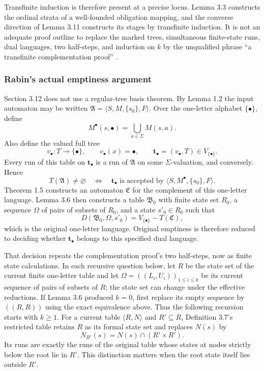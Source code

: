 Transfinite induction is therefore present at a precise locus.  Lemma 3.3
constructs the ordinal strata of a well-founded obligation mapping, and the
converse direction of Lemma 3.11 constructs its stages by transfinite
induction.  It is not an adequate proof outline to replace the marked trees,
simultaneous finite-state runs, dual languages, two half-steps, and induction
on \(k\) by the unqualified phrase
\enquote{a transfinite complementation proof}
\cite[pp.~19--32]{Rabin1969}.

\subsubsection{Rabin's actual emptiness argument}

Section 3.12 does not use a regular-tree basis theorem.  By Lemma 1.2 the
input automaton may be written
\(\mathfrak A=\langle S,M,\{s_0\},F\rangle\).  Over the one-letter alphabet
\(\{\bullet\}\), define
\[
 M^\bullet(s,\bullet)
   =\bigcup_{a\in\Sigma}M(s,a).
\]
Also define the valued full tree
\[
 v_\bullet:T\longrightarrow\{\bullet\},
 \qquad v_\bullet(x)=\bullet,
 \qquad \mathbf t_\bullet=(v_\bullet,T)\in V_{\{\bullet\}}.
\]
Every run of this table on \(\mathbf t_\bullet\) is a
run of \(\mathfrak A\) on some \(\Sigma\)-valuation, and conversely.  Hence
\[
 T(\mathfrak A)\neq\varnothing
 \quad\Longleftrightarrow\quad
 \mathbf t_\bullet\text{ is accepted by }
 \langle S,M^\bullet,\{s_0\},F\rangle.
\]
Theorem 1.5 constructs an automaton \(\mathfrak C\) for the complement of this
one-letter language.  Lemma 3.6 then constructs a table
\(\mathfrak B_0\) with finite state set \(R_0\), a sequence \(\Omega\) of pairs
of subsets of \(R_0\), and a state \(s'_0\in R_0\) such that
\[
 D(\mathfrak B_0,\Omega,s'_0)
   =V_{\{\bullet\}}-T(\mathfrak C),
\]
which is the original one-letter language.  Original emptiness is therefore
reduced to deciding whether \(\mathbf t_\bullet\) belongs to this specified dual
language.

That decision repeats the complementation proof's two half-steps, now as finite
state calculations.  In each recursive question below, let \(R\) be the state
set of the current finite one-letter table and let
\(\Omega=((L_i,U_i))_{1\leq i\leq k}\) be its current sequence of pairs of
subsets of \(R\); the state set can change under the effective reductions.  If
Lemma 3.6 produced \(k=0\), first replace its empty sequence by
\(((R,R))\) using the exact equivalence above.  Thus the following recursion
starts with \(k\geq1\).
For a current table \(\langle R,N\rangle\) and \(R'\subseteq R\), Definition
3.7's restricted table retains \(R\) as its formal state set and replaces
\(N(s)\) by
\[
 N_{R'}(s)=N(s)\cap(R'\times R').
\]
Its runs are exactly the runs of the original table whose states at nodes
strictly below the root lie in \(R'\).  This distinction matters when the root
state itself lies outside \(R'\).

